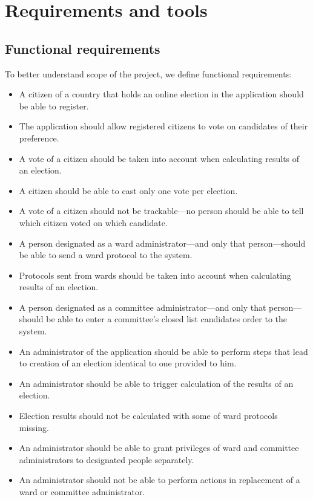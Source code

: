 \documentclass[a4paper,twoside,12pt]{book}
\begin{document}
\chapter{Requirements and tools}
\label{chap:req&tools}
  \section{Functional requirements}
    To better understand scope of the project, we define functional requirements:
    \begin{itemize}
      \item A citizen of a country that holds an online election in the application should be able to register.
      \item The application should allow registered citizens to vote on candidates of their preference.
      \item A vote of a citizen should be taken into account when calculating results of an election.
      \item A citizen should be able to cast only one vote per election.
      \item A vote of a citizen should not be trackable---no person should be able to tell which citizen voted on which candidate.
      \item A person designated as a ward administrator---and only that person---should be able to send a ward protocol to the system.
      \item Protocols sent from wards should be taken into account when calculating results of an election.
      \item A person designated as a committee administrator---and only that person---should be able to enter a committee's closed list candidates order to the system.
      \item An administrator of the application should be able to perform steps that lead to creation of an election identical to one provided to him.
      \item An administrator should be able to trigger calculation of the results of an election.
      \item Election results should not be calculated with some of ward protocols missing.
      \item An administrator should be able to grant privileges of ward and committee administrators to designated people separately.
      \item An administrator should not be able to perform actions in replacement of  a ward or committee administrator.
    \end{itemize}
\end{document}
